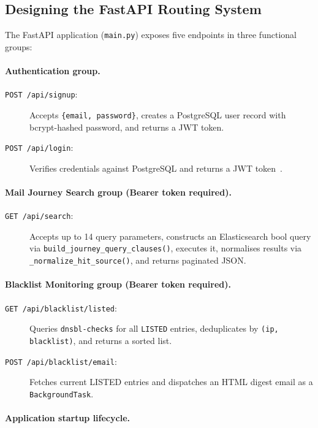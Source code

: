 \documentclass[12pt,a4paper,oneside]{report}
\begin{document}
\subsection{Designing the FastAPI Routing System}

The FastAPI application (\texttt{main.py}) exposes five endpoints in three functional groups:

\paragraph{Authentication group.}
\begin{description}
  \item[\texttt{POST /api/signup}:] Accepts \texttt{\{email, password\}}, creates a PostgreSQL user record with bcrypt-hashed password, and returns a JWT token.
  \item[\texttt{POST /api/login}:] Verifies credentials against PostgreSQL and returns a JWT token~\cite{rfc7519}.
\end{description}

\paragraph{Mail Journey Search group (Bearer token required).}
\begin{description}
  \item[\texttt{GET /api/search}:] Accepts up to 14 query parameters, constructs an Elasticsearch bool query via \texttt{build\_journey\_query\_clauses()}, executes it, normalises results via \texttt{\_normalize\_hit\_source()}, and returns paginated JSON.
\end{description}

\paragraph{Blacklist Monitoring group (Bearer token required).}
\begin{description}
  \item[\texttt{GET /api/blacklist/listed}:] Queries \texttt{dnsbl-checks} for all \texttt{LISTED} entries, deduplicates by \texttt{(ip, blacklist)}, and returns a sorted list.
  \item[\texttt{POST /api/blacklist/email}:] Fetches current LISTED entries and dispatches an HTML digest email as a \texttt{BackgroundTask}.
\end{description}

\paragraph{Application startup lifecycle.}
\end{document}
